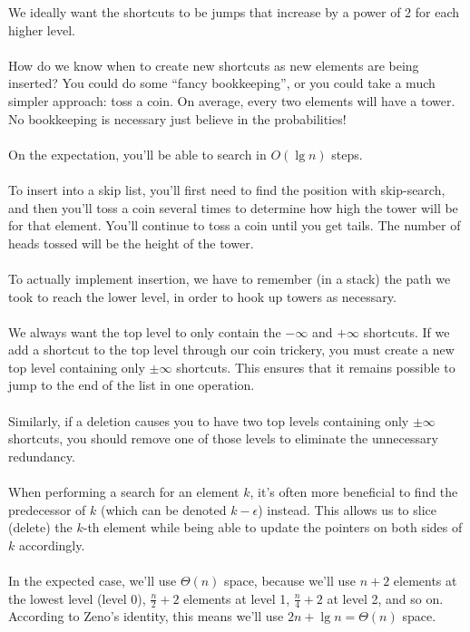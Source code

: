 \documentclass[]{article}
\theoremstyle{definition}
\begin{document}
			We ideally want the shortcuts to be jumps that increase by a power of 2 for each higher level.
			\\ \\
			How do we know when to create new shortcuts as new elements are being inserted? You could do some ``fancy bookkeeping'', or you could take a much simpler approach: toss a coin. On average, every two elements will have a tower. No bookkeeping is necessary \textendash{} just believe in the probabilities!
			\\ \\
			On the expectation, you'll be able to search in $O(\lg n)$ steps.
			\\ \\
			To insert into a skip list, you'll first need to find the position with skip-search, and then you'll toss a coin several times to determine how high the tower will be for that element. You'll continue to toss a coin until you get tails. The number of heads tossed will be the height of the tower.
			\\ \\
			To actually implement insertion, we have to remember (in a stack) the path we took to reach the lower level, in order to hook up towers as necessary.
			\\ \\
			We always want the top level to only contain the $- \infty$ and $+ \infty$ shortcuts. If we add a shortcut to the top level through our coin trickery, you must create a new top level containing only $\pm \infty$ shortcuts. This ensures that it remains possible to jump to the end of the list in one operation.
			\\ \\
			Similarly, if a deletion causes you to have two top levels containing only $\pm \infty$ shortcuts, you should remove one of those levels to eliminate the unnecessary redundancy.
			\\ \\
			When performing a search for an element $k$, it's often more beneficial to find the predecessor of $k$ (which can be denoted $k - \epsilon$) instead. This allows us to slice (delete) the $k$-th element while being able to update the pointers on both sides of $k$ accordingly.
			\\ \\
			In the expected case, we'll use $\Theta(n)$ space, because we'll use $n + 2$ elements at the lowest level (level 0), $\frac{n}{2} + 2$ elements at level 1, $\frac{n}{4} + 2$ at level 2, and so on. According to Zeno's identity, this means we'll use $2n + \lg n = \Theta(n)$ space.
\end{document}
